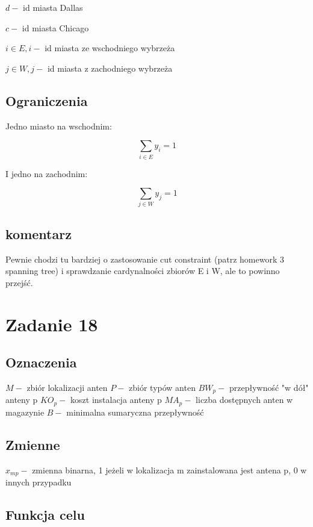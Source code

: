 \documentclass{article}
\begin{document}
$d - $ id miasta Dallas

$c - $ id miasta Chicago

$i \in E, i - $ id miasta ze wschodniego wybrzeża

$j \in W, j - $ id miasta z zachodniego wybrzeża

\subsection{Ograniczenia}

Jedno miasto na wschodnim:

\begin{equation}
  \sum_{i \in E} y_i = 1
\end{equation}


I jedno na zachodnim:

\begin{equation}
  \sum_{j \in W} y_j = 1
\end{equation}

\subsection{komentarz}
Pewnie chodzi tu bardziej o zastosowanie cut constraint (patrz homework 3 spanning tree) i sprawdzanie cardynalności zbiorów E i W, ale to powinno przejść.

\section{Zadanie 18}

\subsection{Oznaczenia}
$M - $ zbiór lokalizacji anten
$P - $ zbiór typów anten
$BW_p - $ przepływność "w dół" anteny p
$KO_p - $ koszt instalacja anteny p
$MA_p - $ liczba dostępnych anten w magazynie
$B - $ minimalna sumaryczna przepływność

\subsection{Zmienne}
$x_{mp} - $ zmienna binarna, 1 jeżeli w lokalizacja m zainstalowana jest antena p, 0 w innych przypadku

\subsection{Funkcja celu}
\end{document}
